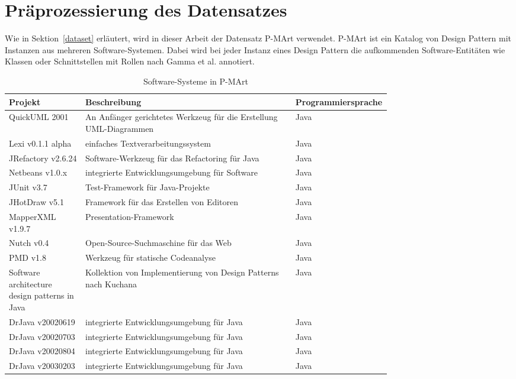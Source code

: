 \section{Präprozessierung des Datensatzes}\label{data_preprocessing}
Wie in Sektion~\ref{dataset} erläutert, wird in dieser Arbeit der Datensatz P-MArt verwendet.
P-MArt ist ein Katalog von Design Pattern mit Instanzen aus mehreren Software-Systemen. 
Dabei wird bei jeder Instanz eines Design Pattern die aufkommenden Software-Entitäten wie Klassen oder Schnittstellen mit Rollen nach Gamma et al. annotiert.

\begin{table}[H]
    \centering
    \begin{tabular}{|p{0.2\linewidth}|p{0.55\linewidth}|p{0,25\linewidth}|}
        \hline
        Projekt & Beschreibung & Programmiersprache\\
        \hline
        QuickUML 2001 & An Anfänger gerichtetes Werkzeug für die Erstellung UML-Diagrammen & Java\\
        Lexi v0.1.1 alpha & einfaches Textverarbeitungssystem & Java\\
        JRefactory v2.6.24 & Software-Werkzeug für das Refactoring für Java & Java\\
        Netbeans v1.0.x & integrierte Entwicklungsumgebung für Software & Java\\
        JUnit v3.7 & Test-Framework für Java-Projekte & Java\\
        JHotDraw v5.1 & Framework für das Erstellen von Editoren & Java\\
        MapperXML v1.9.7 & Presentation-Framework & Java\\
        Nutch v0.4 & Open-Source-Suchmaschine für das Web & Java\\
        PMD v1.8 & Werkzeug für statische Codeanalyse & Java\\
        Software architecture design patterns in Java & Kollektion von Implementierung von Design Patterns nach Kuchana~\cite{10.5555/983553} & Java\\
        DrJava v20020619 & integrierte Entwicklungsumgebung für Java & Java\\
        DrJava v20020703 & integrierte Entwicklungsumgebung für Java & Java\\
        DrJava v20020804 & integrierte Entwicklungsumgebung für Java & Java\\
        DrJava v20030203 & integrierte Entwicklungsumgebung für Java & Java\\
        \hline
    \end{tabular}
    \caption{Software-Systeme in P-MArt}
    \label{tab:pmart_projects}
\end{table}

